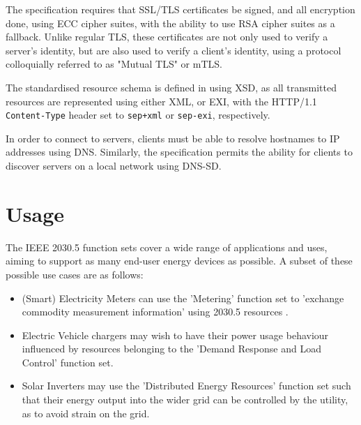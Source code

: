 The specification requires that SSL/TLS certificates be signed, and all encryption done, using ECC cipher suites, with the ability to use RSA cipher suites as a fallback. Unlike regular TLS, these certificates are not only used to verify a server's identity, but are also used to verify a client's identity, using a protocol colloquially referred to as "Mutual TLS" or mTLS.

The standardised resource schema is defined in using XSD, as all transmitted resources are represented using either XML, or EXI, with the HTTP/1.1 \texttt{Content-Type} header set to \texttt{sep+xml} or \texttt{sep-exi}, respectively.

In order to connect to servers, clients must be able to resolve hostnames to IP addresses using DNS. Similarly, the specification permits the ability for clients to discover servers on a local network using DNS-SD.

\section{Usage}
The IEEE 2030.5 function sets cover a wide range of applications and uses, aiming to support as many end-user energy devices as possible. A subset of these possible use cases are as follows:
\begin{itemize}
    \item (Smart) Electricity Meters can use the 'Metering' function set to 'exchange commodity measurement information' using 2030.5 resources \cite{IEEE2030.5}. 
    \item Electric Vehicle chargers may wish to have their power usage behaviour influenced by resources belonging to the 'Demand Response and Load Control' function set.
    \item Solar Inverters may use the 'Distributed Energy Resources' function set such that their energy output into the wider grid can be controlled by the utility, as to avoid strain on the grid.
\end{itemize}
